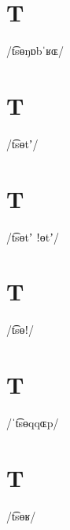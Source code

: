 \documentclass[10pt,a4paper,twoside]{book}
\begin{document}
\section*{T}

\begin{multicols}{3}
 {/t͡sɵŋɒbˈʁɶ/} {}
\end{multicols}

\section*{T}

\begin{multicols}{3}
 {/t͡sɵtʼ/} {}
\end{multicols}

\section*{T}

\begin{multicols}{3}
 {/t͡sɵtʼ ǃɵtʼ/} {}
\end{multicols}

\section*{T}

\begin{multicols}{3}
 {/t͡sɵǃ/} {}
\end{multicols}

\section*{T}

\begin{multicols}{3}
 {/ˈt͡sɵqqɶp/} {}
\end{multicols}

\section*{T}

\begin{multicols}{3}
 {/t͡sɵʁ/} {}
\end{multicols}
\end{document}
